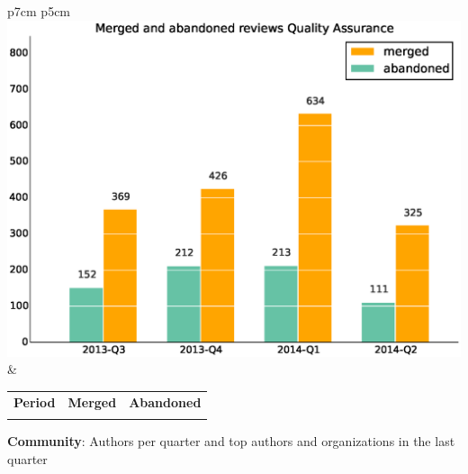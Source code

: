 \documentclass[a4wide,11pt]{report}
\begin{document}
\begin{tabular}{p{7cm} p{5cm}}
    \vspace{0pt} 
    \includegraphics[scale=.35]{figs/submitted_reviewsQualityAssurance.eps}
    & 
    \vspace{0pt}
    \begin{tabular}{l|r|r|}%
    \bfseries Period & \bfseries Merged & \bfseries Abandoned %
    \csvreader[head to column names]{data/submitted_reviewsQualityAssurance.csv}{}%
    {\\ & \merged & \abandoned}
    \end{tabular}
\end{tabular}

\textbf{Community}: Authors per quarter and top authors and organizations in the last quarter
\end{document}
